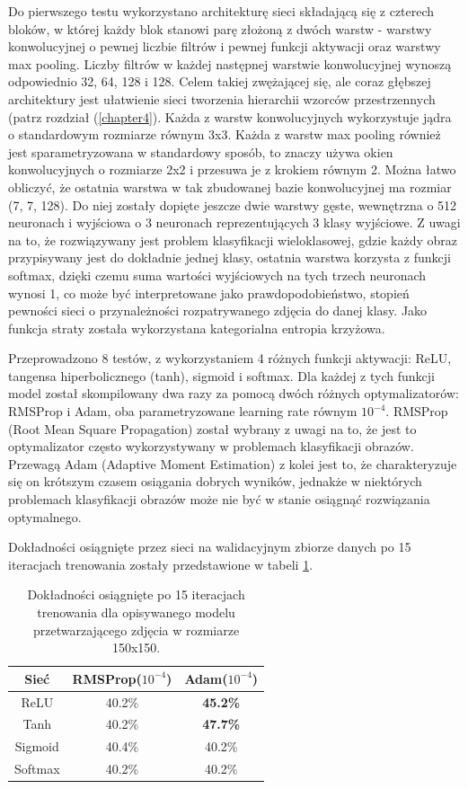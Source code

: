 Do pierwszego testu wykorzystano architekturę sieci składającą się z czterech bloków, w której każdy blok stanowi parę złożoną z dwóch warstw - warstwy konwolucyjnej o pewnej liczbie filtrów i pewnej funkcji aktywacji oraz warstwy max pooling. Liczby filtrów w każdej następnej warstwie konwolucyjnej wynoszą odpowiednio 32, 64, 128 i 128. Celem takiej zwężającej się, ale coraz głębszej architektury jest ułatwienie sieci tworzenia hierarchii wzorców przestrzennych (patrz rozdział (\ref{chapter4}). Każda z warstw konwolucyjnych wykorzystuje jądra o standardowym rozmiarze równym 3x3. Każda z warstw max pooling również jest sparametryzowana w standardowy sposób, to znaczy używa okien konwolucyjnych o rozmiarze 2x2 i przesuwa je z krokiem równym 2. Można łatwo obliczyć, że ostatnia warstwa w tak zbudowanej bazie konwolucyjnej ma rozmiar (7, 7, 128). Do niej zostały dopięte jeszcze dwie warstwy gęste, wewnętrzna o 512 neuronach i wyjściowa o 3 neuronach reprezentujących 3 klasy wyjściowe. Z uwagi na to, że rozwiązywany jest problem klasyfikacji wieloklasowej, gdzie każdy obraz przypisywany jest do dokładnie jednej klasy, ostatnia warstwa korzysta z funkcji softmax, dzięki czemu suma wartości wyjściowych na tych trzech neuronach wynosi 1, co może być interpretowane jako prawdopodobieństwo, stopień pewności sieci o przynależności rozpatrywanego zdjęcia do danej klasy. Jako funkcja straty została wykorzystana kategorialna entropia krzyżowa.

Przeprowadzono 8 testów, z wykorzystaniem 4 różnych funkcji aktywacji: ReLU, tangensa hiperbolicznego (tanh), sigmoid i softmax. Dla każdej z tych funkcji model został skompilowany dwa razy za pomocą dwóch różnych optymalizatorów: RMSProp i Adam, oba parametryzowane learning rate równym $10^{-4}$. RMSProp (Root Mean Square Propagation) został wybrany z uwagi na to, że jest to optymalizator często wykorzystywany w problemach klasyfikacji obrazów. Przewagą Adam (Adaptive Moment Estimation) z kolei jest to, że charakteryzuje się on krótszym czasem osiągania dobrych wyników, jednakże w niektórych problemach klasyfikacji obrazów może nie być w stanie osiągnąć rozwiązania optymalnego.

Dokładności osiągnięte przez sieci na walidacyjnym zbiorze danych po 15 iteracjach trenowania zostały przedstawione w tabeli \ref{tab:5.1}.

\begin{table}[H]
  \caption{Dokładności osiągnięte po 15 iteracjach trenowania dla opisywanego modelu przetwarzającego zdjęcia w rozmiarze 150x150.}
    \centering
    \begin{tabular}{ |c|c|c| }
    \hline
    Sieć & RMSProp($10^{-4}$) & Adam($10^{-4}$) \\
    \hline
    ReLU & 40.2\% & \textbf{45.2\%} \\
    Tanh & 40.2\% & \textbf{47.7\%} \\
    Sigmoid & 40.4\% & 40.2\% \\
    Softmax & 40.2\% & 40.2\% \\
    \hline
    \end{tabular}
  \label{tab:5.1}
\end{table}

